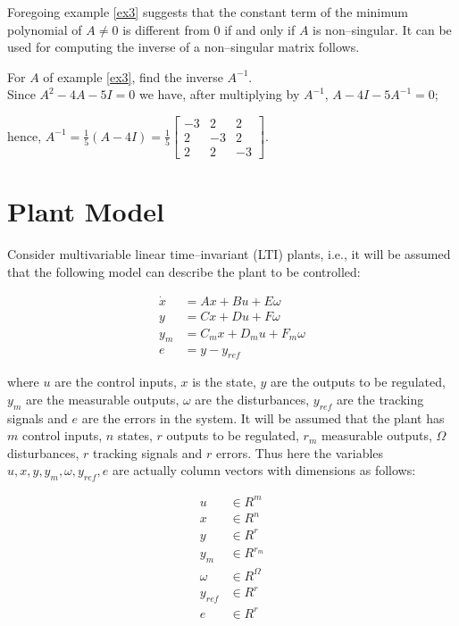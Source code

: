 \documentclass[a4paper]{article}
\theoremstyle{plain} %
{\theorembodyfont{\normalfont}
\newtheorem{Exa}{Example}}
\begin{document}
Foregoing example \ref{ex3} suggests that the constant term of the
minimum polynomial of $A \neq 0$ is different from $0$ if and only
if $A$ is non--singular. It can be used for computing the inverse
of a non--singular matrix follows.

\begin{Exa}
For $A$ of example \ref{ex3}, find the inverse $A^{-1}$. \\ %
Since $A^2-4A-5I = 0$ we have, after multiplying by $A^{-1}$,
$A-4I-5A^{-1} = 0$; %

\vspace{0.5\baselineskip}

hence, $A^{-1}=\frac{1}{5} (A-4I) = \frac{1}{5} \left[
\begin{array}{rrr} -3 & 2 & 2 \\ 2 & -3 & 2 \\ 2 &
2 & -3
\end{array} \right]$.

\end{Exa}

\section{Plant Model}
Consider multivariable linear time--invariant (LTI) plants, i.e.,
it will be assumed that the following model can describe the plant to be controlled: %

\begin{align}\label{pmodel}
  \dot{x} &= Ax + Bu + E\omega \nonumber \\%
  y &= Cx + Du + F\omega \\ %
  y_m &= C_mx + D_mu + F_m\omega \nonumber \\%
  e &= y - y_{ref} \nonumber
\end{align}

where $u$ are the control inputs, $x$ is the state, $y$ are the
outputs to be regulated, $y_m$ are the measurable outputs,
$\omega$ are the disturbances, $y_{ref}$ are the tracking signals
and $e$ are the errors in the system. It will be assumed that the
plant has $m$ control inputs, $n$ states, $r$ outputs to be
regulated, $r_m$ measurable outputs, $\Omega$ disturbances, $r$
tracking signals and $r$ errors. Thus here the variables
$u,x,y,y_m,\omega,y_{ref},e$ are actually column vectors with
dimensions as follows:

\begin{align}
u &\in R^m \nonumber \\ %
x &\in R^n \nonumber \\%
y &\in R^r \nonumber \\ %
y_m &\in R^{r_m} \nonumber \\ %
\omega &\in R^{\Omega} \nonumber \\ %
y_{ref} &\in R^r \nonumber \\%
e &\in R^r \nonumber
\end{align}
\end{document}
